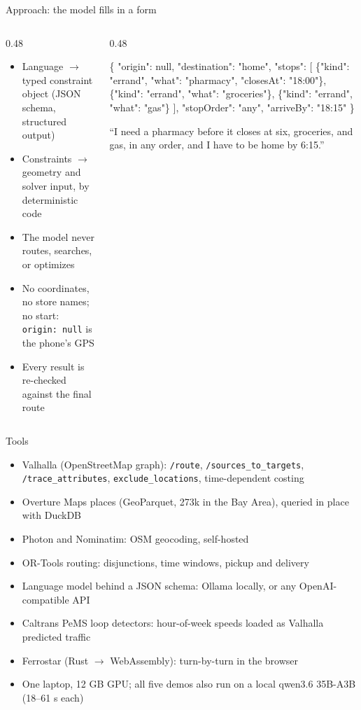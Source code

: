 \documentclass[aspectratio=169]{beamer}
\newcommand{\api}[1]{\texttt{#1}}
\begin{document}
\begin{frame}[fragile]{Approach: the model fills in a form}
  \begin{columns}[T]
    \begin{column}{0.48\textwidth}
      \begin{itemize}
        \item Language $\to$ typed constraint object (JSON schema, structured output)
        \item Constraints $\to$ geometry and solver input, by deterministic code
        \item The model never routes, searches, or optimizes
        \item No coordinates, no store names; no start: \texttt{origin: null} is the phone's GPS
        \item Every result is re-checked against the final route
      \end{itemize}
    \end{column}
    \begin{column}{0.48\textwidth}
\begin{semiverbatim}\scriptsize
\{
  "origin": null,
  "destination": "home",
  "stops": [
    \{"kind": "errand", "what": "pharmacy",
     "closesAt": "18:00"\},
    \{"kind": "errand", "what": "groceries"\},
    \{"kind": "errand", "what": "gas"\}
  ],
  "stopOrder": "any",
  "arriveBy": "18:15"
\}
\end{semiverbatim}
      {\footnotesize ``I need a pharmacy before it closes at six, groceries, and gas, in any order, and I have to be home by 6:15.''}
    \end{column}
  \end{columns}
\end{frame}

\begin{frame}{Tools}
  \begin{itemize}
    \item Valhalla (OpenStreetMap graph): \api{/route}, \api{/sources\_to\_targets}, \api{/trace\_attributes}, \api{exclude\_locations}, time-dependent costing
    \item Overture Maps places (GeoParquet, 273k in the Bay Area), queried in place with DuckDB
    \item Photon and Nominatim: OSM geocoding, self-hosted
    \item OR-Tools routing: disjunctions, time windows, pickup and delivery
    \item Language model behind a JSON schema: Ollama locally, or any OpenAI-compatible API
    \item Caltrans PeMS loop detectors: hour-of-week speeds loaded as Valhalla predicted traffic
    \item Ferrostar (Rust $\to$ WebAssembly): turn-by-turn in the browser
    \item One laptop, 12 GB GPU; all five demos also run on a local qwen3.6 35B-A3B (18--61 s each)
  \end{itemize}
\end{frame}
\end{document}
